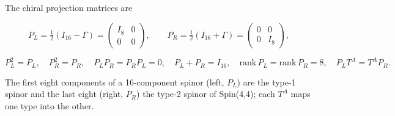 \documentclass[10pt]{article}
\makeatletter
\newcommand\keepnext{\par\nopagebreak\@nobreaktrue\everypar{\@nobreakfalse\everypar{}}}
\makeatother
\begin{document}
The chiral projection matrices are\keepnext


\[
P_L = \tfrac12(I_{16} - \Gamma) = \begin{pmatrix} I_8 & 0 \\ 0 & 0 \end{pmatrix}, \qquad P_R = \tfrac12(I_{16} + \Gamma) = \begin{pmatrix} 0 & 0 \\ 0 & I_8 \end{pmatrix},
\]

\[
P_L^2 = P_L,\quad P_R^2 = P_R,\quad P_LP_R = P_RP_L = 0,\quad P_L + P_R = I_{16},\quad \mathrm{rank}\,P_L = \mathrm{rank}\,P_R = 8,\quad P_L T^A = T^A P_R .
\]

The first eight components of a 16-component spinor (left, $P_L$) are the type-1 spinor and the last eight (right, $P_R$) the type-2 spinor of Spin(4,4); each $T^A$ maps one type into the other.\keepnext
\end{document}
